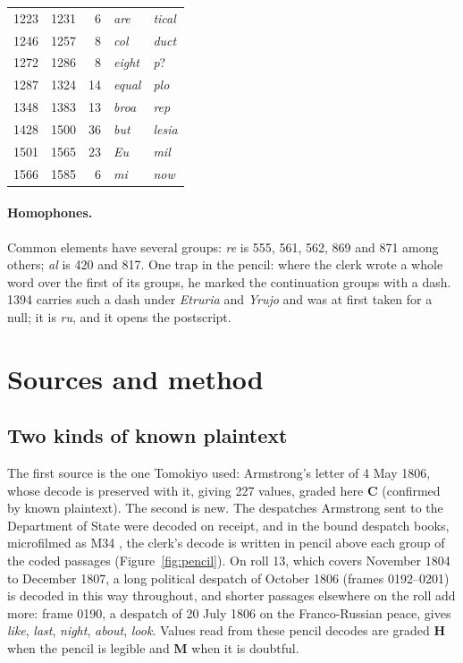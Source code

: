 \documentclass[]{interact}
\newcommand{\grp}[1]{\textsf{#1}}
\begin{document}
\begin{table}
{\begin{tabular}{@{}rrrll@{}}
1223 & 1231 & 6 & \emph{are} & \emph{tical} \\
1246 & 1257 & 8 & \emph{col} & \emph{duct} \\
1272 & 1286 & 8 & \emph{eight} & \emph{p}? \\
1287 & 1324 & 14 & \emph{equal} & \emph{plo} \\
1348 & 1383 & 13 & \emph{broa} & \emph{rep} \\
1428 & 1500 & 36 & \emph{but} & \emph{lesia} \\
1501 & 1565 & 23 & \emph{Eu} & \emph{mil} \\
1566 & 1585 & 6 & \emph{mi} & \emph{now} \\
\bottomrule
\end{tabular}}
\label{tab:runs}
\end{table}

\paragraph{Homophones.} Common elements have several groups: \emph{re} is \grp{555}, \grp{561}, \grp{562}, \grp{869} and \grp{871} among others; \emph{al} is \grp{420} and \grp{817}. One trap in the pencil: where the clerk wrote a whole word over the first of its groups, he marked the continuation groups with a dash. \grp{1394} carries such a dash under \emph{Etruria} and \emph{Yrujo} and was at first taken for a null; it is \emph{ru}, and it opens the postscript.

\section{Sources and method}\label{sec:method}

\subsection{Two kinds of known plaintext}

The first source is the one Tomokiyo used: Armstrong's letter of 4 May 1806, whose decode is preserved with it, giving 227 values, graded here \textbf{C} (confirmed by known plaintext). The second is new. The despatches Armstrong sent to the Department of State were decoded on receipt, and in the bound despatch books, microfilmed as M34 \citep{NARA:M34}, the clerk's decode is written in pencil above each group of the coded passages (Figure~\ref{fig:pencil}). On roll 13, which covers November 1804 to December 1807, a long political despatch of October 1806 (frames 0192--0201) is decoded in this way throughout, and shorter passages elsewhere on the roll add more: frame 0190, a despatch of 20 July 1806 on the Franco-Russian peace, gives \emph{like}, \emph{last}, \emph{night}, \emph{about}, \emph{look}. Values read from these pencil decodes are graded \textbf{H} when the pencil is legible and \textbf{M} when it is doubtful.
\end{document}
